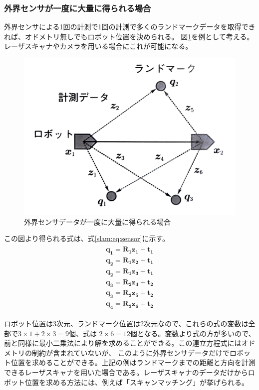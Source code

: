 \subsubsection{外界センサが一度に大量に得られる場合}
外界センサによる1回の計測で1回の計測で多くのランドマークデータを取得できれば、オドメトリ無しでもロボット位置を決められる。
図\ref{slam:sensor}を例として考える。レーザスキャナやカメラを用いる場合にこれが可能になる。

\begin{figure}[h]
  \begin{center}
  \includegraphics[width=.6\columnwidth]{img/slam_8.pdf}
  \caption{外界センサデータが一度に大量に得られる場合}
  \label{slam:sensor}
  \end{center}
\end{figure}

この図より得られる式は、式\eqref{slam:eq:sensor}に示す。
\begin{align}
  \begin{split}
    \bm{q_1} = \bm{R_1z_1+t_1}\\
    \bm{q_2} = \bm{R_1z_2+t_1}\\
    \bm{q_2} = \bm{R_1z_3+t_1}\\
    \bm{q_3} = \bm{R_2z_4+t_2}\\
    \bm{q_3} = \bm{R_3z_5+t_2}\\
    \bm{q_4} = \bm{R_3z_6+t_2} \label{slam:eq:sensor}
  \end{split}
\end{align}

ロボット位置は3次元、ランドマーク位置は2次元なので、これらの式の変数は全部で$3\times1+2\times3=9$個、式は
$2\times6 = 12$個となる。変数より式の方が多いので、前と同様に最小二乗法により解を求めることができる。この連立方程式にはオドメトリの制約が含まれていないが、
このように外界センサデータだけでロボット位置を求めることができる。上記の例はランドマークまでの距離と方向を計測できるレーザスキャナを用いた場合である。レーザスキャナのデータだけからロボット位置を求める方法には、例えば「スキャンマッチング」が挙げられる。

